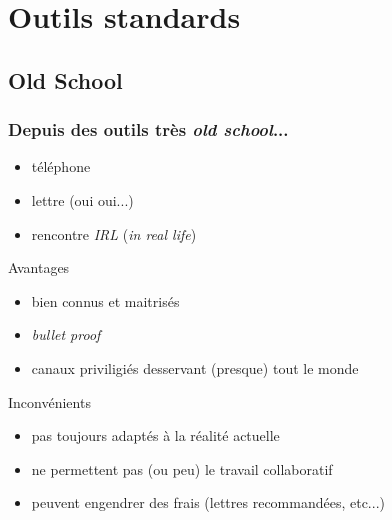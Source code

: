 \documentclass{beamer}
\begin{document}
\section{Outils standards} %

\subsection{Old School} %

\begin{frame}
    \frametitle{Depuis des outils très \textit{old school}...}

    \pause{}

    \begin{itemize}
        \item téléphone
        \item lettre (oui oui...)
        \item rencontre \textit{IRL} (\textit{in real life})
    \end{itemize}
\end{frame}

\begin{frame}
    \begin{block}{Avantages}
    \begin{itemize}
        \item bien connus et maitrisés
        \item \textit{bullet proof}
        \item canaux priviligiés desservant (presque) tout le monde
    \end{itemize}
    \end{block}

    \pause{}

    \begin{block}{Inconvénients}
    \begin{itemize}
        \item pas toujours adaptés à la réalité actuelle
        \item ne permettent pas (ou peu) le travail collaboratif
        \item peuvent engendrer des frais (lettres recommandées, etc...)
    \end{itemize}
    \end{block}

\end{frame}
\end{document}
